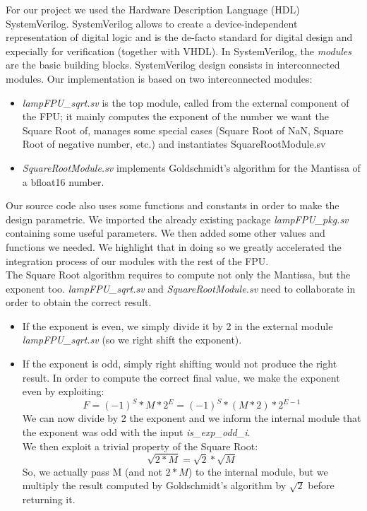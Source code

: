 For our project we used the Hardware Description Language (HDL) SystemVerilog. SystemVerilog allows to create a device-independent representation of digital logic and is the de-facto standard for digital design and expecially for verification (together with VHDL). 
In SystemVerilog, the \emph{modules} are the basic building blocks. SystemVerilog design consists in interconnected modules.
Our implementation is based on two interconnected modules:

\begin{itemize}
\item \emph{lampFPU\_sqrt.sv} is the top module, called from the external component of the FPU; it mainly computes the exponent of the number we want the Square Root of, manages some special cases (Square Root of NaN, Square Root of negative number, etc.) and instantiates SquareRootModule.sv
\item \emph{SquareRootModule.sv} implements Goldschmidt's algorithm for the Mantissa of a bfloat16 number. 
\end{itemize}

Our source code also uses some functions and constants in order to make the design parametric. We imported the already existing package \emph{lampFPU\_pkg.sv} containing some useful parameters. We then added some other values and functions we needed. We highlight that in doing so we greatly accelerated the integration process of our modules with the rest of the FPU. \\

The Square Root algorithm requires to compute not only the Mantissa, but the exponent too. \emph{lampFPU\_sqrt.sv} and  \emph{SquareRootModule.sv} need to collaborate in order to obtain the correct result. 
\begin{itemize}
\item If the exponent is even, we simply divide it by 2 in the external module \emph{lampFPU\_sqrt.sv}  (so we right shift the exponent).
\item If the exponent is odd, simply right shifting would not produce the right result. In order to compute the correct final value, we make the exponent even by exploiting:
$$F = (-1)^{S}*M*2^{E}  = (-1)^{S}*(M*2)*2^{E-1} $$
We can now divide by 2 the exponent and we inform the internal module that the exponent was odd with the input \emph{is\_exp\_odd\_i}. \\
We then exploit a trivial property of the Square Root:
$$ \sqrt{2*M} = \sqrt{2} * \sqrt{M} $$
So, we actually pass M (and not $2 * M$) to the internal module, but we multiply the result computed by Goldschmidt's algorithm by $\sqrt{2}$ before returning it.
\end{itemize} 

